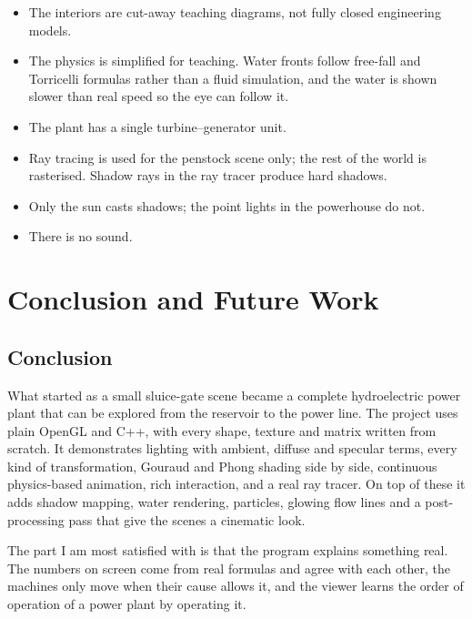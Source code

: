 \documentclass[11pt,a4paper]{report}
\begin{document}
\begin{itemize}
  \item The interiors are cut-away teaching diagrams, not fully closed engineering
        models.
  \item The physics is simplified for teaching. Water fronts follow free-fall and
        Torricelli formulas rather than a fluid simulation, and the water is shown slower
        than real speed so the eye can follow it.
  \item The plant has a single turbine--generator unit.
  \item Ray tracing is used for the penstock scene only; the rest of the world is
        rasterised. Shadow rays in the ray tracer produce hard shadows.
  \item Only the sun casts shadows; the point lights in the powerhouse do not.
  \item There is no sound.
\end{itemize}

\chapter{Conclusion and Future Work}
\label{ch:conclusion}

\section{Conclusion}

What started as a small sluice-gate scene became a complete hydroelectric power plant
that can be explored from the reservoir to the power line. The project uses plain
OpenGL and C++, with every shape, texture and matrix written from scratch. It
demonstrates lighting with ambient, diffuse and specular terms, every kind of
transformation, Gouraud and Phong shading side by side, continuous physics-based
animation, rich interaction, and a real ray tracer. On top of these it adds shadow
mapping, water rendering, particles, glowing flow lines and a post-processing pass that
give the scenes a cinematic look.

The part I am most satisfied with is that the program explains something real. The
numbers on screen come from real formulas and agree with each other, the machines only
move when their cause allows it, and the viewer learns the order of operation of a
power plant by operating it.
\end{document}
